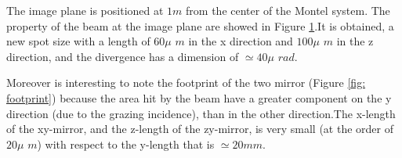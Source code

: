 The image plane is positioned at $1m$ from the center of the Montel system. The property of the beam at the image plane are showed in Figure \ref{fig: ID20image}.It is obtained, a new spot size with a length of $60 \mu $ $m$ in the x direction and $100 \mu $ $m$ in the z direction, and the divergence has a dimension of $\simeq 40\mu$ $rad$.
\begin{figure}[H]
%
\centering
%
%
\quad
%
\label{fig: ID20image}
%
\end{figure}
\noindent Moreover is interesting to note the footprint of the two mirror (Figure \ref{fig: footprint}) because the area hit by the beam have a greater component on the y direction (due to the grazing incidence), than in the other direction.The x-length of the xy-mirror, and the z-length of the zy-mirror, is very small (at the order of $20 \mu $ $m$) with respect to the y-length that is $\simeq 20mm$.
%
